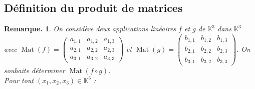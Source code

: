 \documentclass[12pt]{article}
\theoremstyle{break}
\newtheorem*{remark}{Remarque.}
\begin{document}
\newpage

\subsection{Définition du produit de matrices}
\begin{remark}
On considère deux applications linéaires $f$ et $g$ de $\mathbb{K}^{3}$ dans $\mathbb{K}^{3}$ avec $\operatorname{Mat}(f)=\left(\begin{array}{lll}a_{1,1} & a_{1,2} & a_{1,3} \\ a_{2,1} & a_{2,2} & a_{2,3} \\ a_{3,1} & a_{3,2} & a_{3,3}\end{array}\right)$ et $\operatorname{Mat}(g)=\left(\begin{array}{lll}b_{1,1} & b_{1,2} & b_{1,3} \\ b_{2,1} & b_{2,2} & b_{2,3} \\ b_{3,1} & b_{3,2} & b_{3,3}\end{array}\right)$. On souhaite déterminer $\operatorname{Mat}(f \circ g)$.\\
Pour tout $\left(x_{1}, x_{2}, x_{3}\right) \in \mathbb{K}^{3}$ :


\end{remark}
\end{document}
